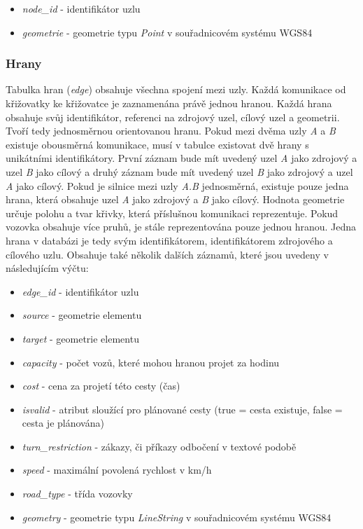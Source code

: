\vspace{10pt}
\begin{itemize}
  \item \textit{node\_id} - identifikátor uzlu
  \item \textit{geometrie} - geometrie typu \textit{Point} v souřadnicovém systému WGS84
\end{itemize}
\vspace{10pt}

\subsubsection{Hrany}

Tabulka hran (\textit{edge}) obsahuje všechna spojení mezi uzly. Každá komunikace od křižovatky ke křižovatce je zaznamenána právě jednou hranou. Každá hrana obsahuje svůj identifikátor, referenci na zdrojový uzel, cílový uzel a geometrii. Tvoří tedy jednosměrnou orientovanou hranu. Pokud mezi dvěma uzly \textit{A} a \textit{B} existuje obousměrná komunikace, musí v tabulce existovat dvě hrany s unikátními identifikátory. První záznam bude mít uvedený uzel \textit{A} jako zdrojový a uzel \textit{B} jako cílový a druhý záznam bude mít uvedený uzel \textit{B} jako zdrojový a uzel \textit{A} jako cílový. Pokud je silnice mezi uzly \textit{A.B} jednosměrná, existuje pouze jedna hrana, která obsahuje uzel \textit{A} jako zdrojový a \textit{B} jako cílový. Hodnota geometrie určuje polohu a tvar křivky, která příslušnou komunikaci reprezentuje. Pokud vozovka obsahuje více pruhů, je stále reprezentována pouze jednou hranou. Jedna hrana v databázi je tedy svým identifikátorem, identifikátorem zdrojového a cílového uzlu. Obsahuje také několik dalších záznamů, které jsou uvedeny v následujícím výčtu:   

\vspace{10pt}
\begin{itemize}
  \item \textit{edge\_id} - identifikátor uzlu
  \item \textit{source} - geometrie elementu
  \item \textit{target} - geometrie elementu
  \item \textit{capacity} - počet vozů, které mohou hranou projet za hodinu
  \item \textit{cost} - cena za projetí této cesty (čas)
  \item \textit{isvalid} - atribut sloužící pro plánované cesty (true = cesta existuje, false = cesta je plánována)
  \item \textit{turn\_restriction} - zákazy, či příkazy odbočení v textové podobě
  \item \textit{speed} - maximální povolená rychlost v km/h
  \item \textit{road\_type} - třída vozovky
  \item \textit{geometry} - geometrie typu \textit{LineString} v souřadnicovém systému WGS84
\end{itemize}
\vspace{10pt}

